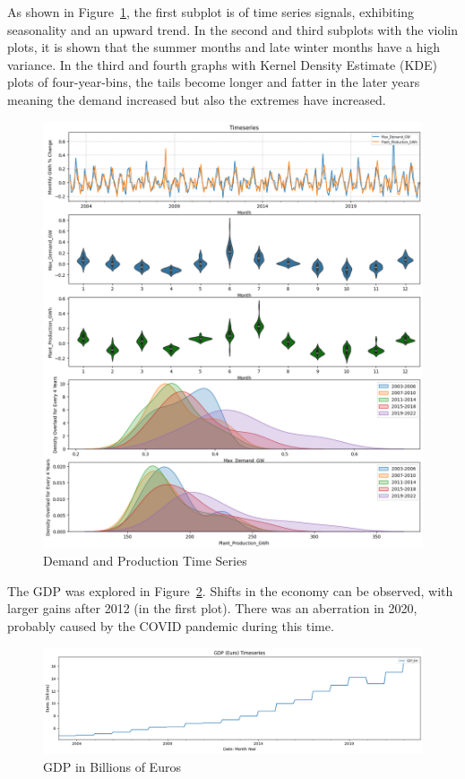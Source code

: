 \documentclass{ieeeaccess}
\begin{document}
As shown in Figure~\ref{fig:elec_timeseries}, the first subplot is of time series signals, exhibiting seasonality and an upward trend.
In the second and third subplots with the violin plots, it is shown that the summer months and late winter months have a high variance. 
In the third and fourth graphs with Kernel Density Estimate (KDE) plots of four-year-bins, the tails become longer and fatter in the later years meaning the demand increased but also the extremes have increased.
\begin{figure}[htb]
    \centering
    \includegraphics[width=\columnwidth]{data_analysis/production_timeseries.png}
    \caption{Demand and Production Time Series}
    \label{fig:elec_timeseries}
\end{figure}

The GDP was explored in Figure~\ref{fig:gdp_timeseries}. Shifts in the economy can be observed, with larger gains after 2012 (in the first plot). There was an aberration in 2020, probably caused by the COVID pandemic during this time.
\begin{figure}[htb]
    \centering
    \includegraphics[width=\columnwidth]{data_analysis/gdp_timeseries.png}
    \caption{GDP in Billions of Euros}
    \label{fig:gdp_timeseries}
\end{figure}
\end{document}
